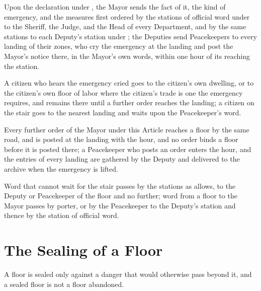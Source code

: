\begin{clauses}
\item Upon the declaration under , the Mayor sends the fact of it, the kind of emergency, and the measures first ordered by the stations of official word under  to the Sheriff, the Judge, and the Head of every Department, and by the same stations to each Deputy's station under ; the Deputies send Peacekeepers to every landing of their zones, who cry the emergency at the landing and post the Mayor's notice there, in the Mayor's own words, within one hour of its reaching the station.
\item A citizen who hears the emergency cried goes to the citizen's own dwelling, or to the citizen's own floor of labor where the citizen's trade is one the emergency requires, and remains there until a further order reaches the landing; a citizen on the stair goes to the nearest landing and waits upon the Peacekeeper's word.
\item Every further order of the Mayor under this Article reaches a floor by the same road, and is posted at the landing with the hour, and no order binds a floor before it is posted there; a Peacekeeper who posts an order enters the hour, and the entries of every landing are gathered by the Deputy and delivered to the archive when the emergency is lifted.
\item Word that cannot wait for the stair passes by the stations as  allows, to the Deputy or Peacekeeper of the floor and no further; word from a floor to the Mayor passes by porter, or by the Peacekeeper to the Deputy's station and thence by the station of official word.
\end{clauses}

\section{The Sealing of a Floor}
\label{sec:emergency:sealing-of-a-floor}

A floor is sealed only against a danger that would otherwise pass beyond it, and a sealed floor is not a floor abandoned.

